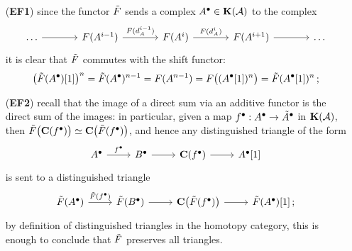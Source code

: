     \begin{itemize}
        \item[(\textbf{EF1})] since the functor $\Tilde{F}$
        sends a complex $A^{\bullet} \in {\normalfont\textbf{K}}(\mathcal{A})$ to
        the complex
        \begin{equation*}
            \begin{tikzcd}[column sep=large]
                \dots \ar[r]
                & F(A^{i-1}) \ar[r, "F(d_{A}^{i-1})"]
                & F(A^{i}) \ar[r, "F(d_{A}^{i})"]
                & F(A^{i+1}) \ar[r]
                & \dots
            \end{tikzcd}
        \end{equation*}
        it is clear that $\Tilde{F}$ commutes with the shift functor:
        \begin{equation*}
            \big( \Tilde{F}(A^{\bullet})[1] \big)^{n}
            = \Tilde{F}(A^{\bullet})^{n-1} 
            = F(A^{n-1})
            = F\big( (A^{\bullet}[1])^{n} \big)
            = \Tilde{F}(A^{\bullet}[1])^{n}\,;
        \end{equation*}

        \item[(\textbf{EF2})] recall that the image of a direct sum
        via an additive functor is the direct sum of the images:
        in particular, given a map 
        $f^{\bullet}:A^{\bullet} \to \Tilde{A}^{\bullet}$ in ${\normalfont\textbf{K}}(\mathcal{A})$,
        then $\Tilde{F}\big({\normalfont\textbf{C}}(f^{\bullet})\big) 
        \simeq {\normalfont\textbf{C}}\big(\Tilde{F}(f^{\bullet})\big)$,
        and hence any distinguished triangle of the form
        \begin{equation*}
            \begin{tikzcd}
                A^{\bullet} \ar[r, "f^{\bullet}"]
                & B^{\bullet} \ar[r]
                & \cat{C}(f^{\bullet}) \ar[r]
                & A^{\bullet}{[1]}
            \end{tikzcd}
        \end{equation*}
        is sent to a distinguished triangle
        \begin{equation*}
            \begin{tikzcd}
                \Tilde{F}(A^{\bullet}) \ar[r, "\Tilde{F}(f^{\bullet})"]
                & \Tilde{F}(B^{\bullet}) \ar[r]
                & \cat{C}\big(\Tilde{F}(f^{\bullet})\big) \ar[r]
                & \Tilde{F}(A^{\bullet}){[1]}\,;
            \end{tikzcd}
        \end{equation*}
        by definition of distinguished triangles in the homotopy
        category, this is enough to conclude that $\Tilde{F}$
        preserves all triangles.
    \end{itemize}

